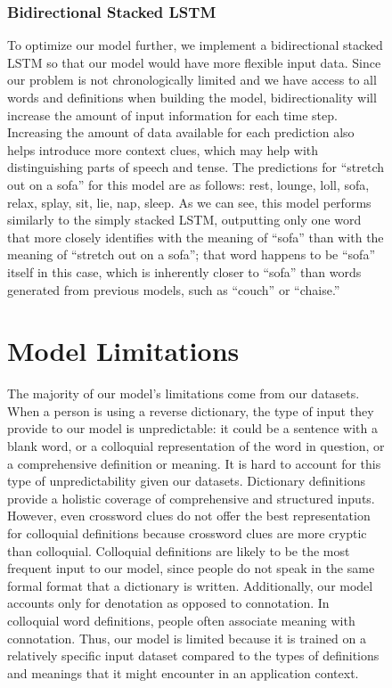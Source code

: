\documentclass{article} %
\begin{document}
\begin{figure}
\subsubsection{Bidirectional Stacked LSTM}
To optimize our model further, we implement a bidirectional stacked LSTM so that our model would have more flexible input data. Since our problem is not chronologically limited and we have access to all words and definitions when building the model, bidirectionality will increase the amount of input information for each time step. Increasing the amount of data available for each prediction also helps introduce more context clues, which may help with distinguishing parts of speech and tense.  
The predictions for “stretch out on a sofa” for this model are as follows: rest, lounge, loll, sofa, relax, splay, sit, lie, nap, sleep.
As we can see, this model performs similarly to the simply stacked LSTM, outputting only one word that more closely identifies with the meaning of “sofa” than with the meaning of “stretch out on a sofa”; that word happens to be “sofa” itself in this case, which is inherently closer to “sofa” than words generated from previous models, such as “couch” or “chaise.”

\section{Model Limitations}
The majority of our model’s limitations come from our datasets. When a person is using a reverse dictionary, the type of input they provide to our model is unpredictable: it could be a sentence with a blank word, or a colloquial representation of the word in question, or a comprehensive definition or meaning. It is hard to account for this type of unpredictability given our datasets. Dictionary definitions provide a holistic coverage of comprehensive and structured inputs. However, even crossword clues do not offer the best representation for colloquial definitions because crossword clues are more cryptic than colloquial. 
Colloquial definitions are likely to be the most frequent input to our model, since people do not speak in the same formal format that a dictionary is written. Additionally, our model accounts only for denotation as opposed to connotation. In colloquial word definitions, people often associate meaning with connotation. Thus, our model is limited because it is trained on a relatively specific input dataset compared to the types of definitions and meanings that it might encounter in an application context.


\end{figure}
\end{document}
